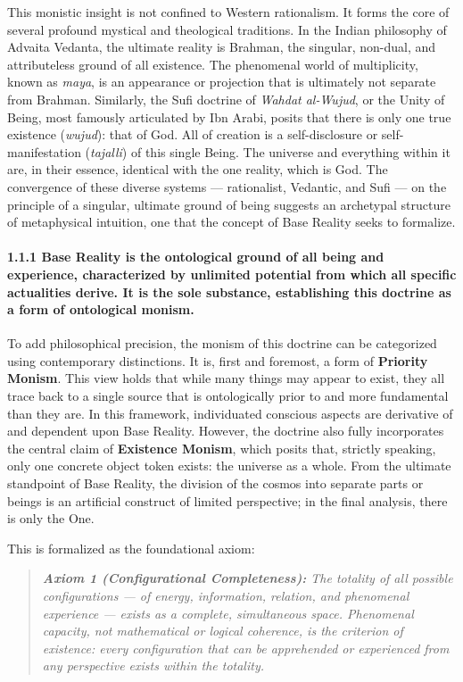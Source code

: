 This monistic insight is not confined to Western rationalism. It forms the core of several profound mystical and theological traditions. In the Indian philosophy of Advaita Vedanta, the ultimate reality is Brahman, the singular, non-dual, and attributeless ground of all existence. The phenomenal world of multiplicity, known as \textit{maya}, is an appearance or projection that is ultimately not separate from Brahman. Similarly, the Sufi doctrine of \textit{Wahdat al-Wujud}, or the Unity of Being, most famously articulated by Ibn Arabi, posits that there is only one true existence (\textit{wujud}): that of God. All of creation is a self-disclosure or self-manifestation (\textit{tajalli}) of this single Being. The universe and everything within it are, in their essence, identical with the one reality, which is God. The convergence of these diverse systems — rationalist, Vedantic, and Sufi — on the principle of a singular, ultimate ground of being suggests an archetypal structure of metaphysical intuition, one that the concept of Base Reality seeks to formalize.


\paragraph*{1.1.1 Base Reality is the ontological ground of all being and experience, characterized by unlimited potential from which all specific actualities derive. It is the sole substance, establishing this doctrine as a form of ontological monism.}


To add philosophical precision, the monism of this doctrine can be categorized using contemporary distinctions. It is, first and foremost, a form of \textbf{Priority Monism}. This view holds that while many things may appear to exist, they all trace back to a single source that is ontologically prior to and more fundamental than they are. In this framework, individuated conscious aspects are derivative of and dependent upon Base Reality. However, the doctrine also fully incorporates the central claim of \textbf{Existence Monism}, which posits that, strictly speaking, only one concrete object token exists: the universe as a whole. From the ultimate standpoint of Base Reality, the division of the cosmos into separate parts or beings is an artificial construct of limited perspective; in the final analysis, there is only the One.


This is formalized as the foundational axiom:


\begin{quote}
\itshape
\textbf{Axiom 1 (Configurational Completeness):} \textit{The totality of all possible configurations — of energy, information, relation, and phenomenal experience — exists as a complete, simultaneous space. Phenomenal capacity, not mathematical or logical coherence, is the criterion of existence: every configuration that can be apprehended or experienced from any perspective exists within the totality.}
\end{quote}


